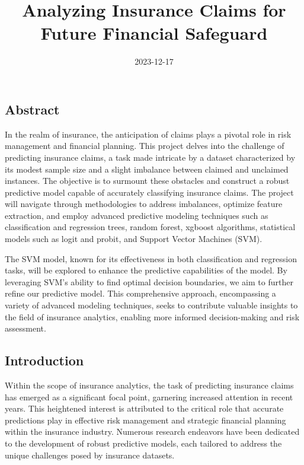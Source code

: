 \documentclass[
]{article}
\title{Analyzing Insurance Claims for Future Financial Safeguard}
\author{}
\date{\vspace{-2.5em}2023-12-17}
\begin{document}
\maketitle

\hypertarget{abstract}{%
\subsection{Abstract}\label{abstract}}

In the realm of insurance, the anticipation of claims plays a pivotal
role in risk management and financial planning. This project delves into
the challenge of predicting insurance claims, a task made intricate by a
dataset characterized by its modest sample size and a slight imbalance
between claimed and unclaimed instances. The objective is to surmount
these obstacles and construct a robust predictive model capable of
accurately classifying insurance claims. The project will navigate
through methodologies to address imbalances, optimize feature
extraction, and employ advanced predictive modeling techniques such as
classification and regression trees, random forest, xgboost algorithms,
statistical models such as logit and probit, and Support Vector Machines
(SVM).

The SVM model, known for its effectiveness in both classification and
regression tasks, will be explored to enhance the predictive
capabilities of the model. By leveraging SVM's ability to find optimal
decision boundaries, we aim to further refine our predictive model. This
comprehensive approach, encompassing a variety of advanced modeling
techniques, seeks to contribute valuable insights to the field of
insurance analytics, enabling more informed decision-making and risk
assessment.

\newpage

\hypertarget{introduction}{%
\subsection{Introduction}\label{introduction}}

Within the scope of insurance analytics, the task of predicting
insurance claims has emerged as a significant focal point, garnering
increased attention in recent years. This heightened interest is
attributed to the critical role that accurate predictions play in
effective risk management and strategic financial planning within the
insurance industry. Numerous research endeavors have been dedicated to
the development of robust predictive models, each tailored to address
the unique challenges posed by insurance datasets.
\end{document}
